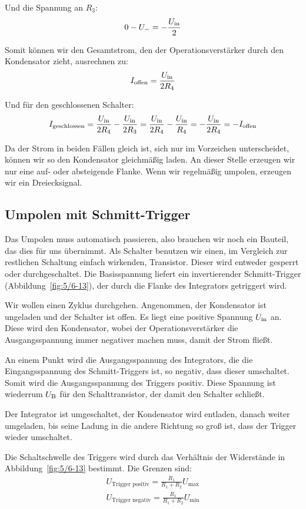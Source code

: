 Und die Spannung an $R_3$:
\[
	0 - U_- = - \frac{U_\text{in}}2
\]

Somit können wir den Gesamtstrom, den der Operationsverstärker durch den
Kondensator zieht, ausrechnen zu:
\[
	I_\text{offen}
	= \frac{U_\text{in}}{2 R_4}
\]

Und für den geschlossenen Schalter:
\[
	I_\text{geschlossen}
	= \frac{U_\text{in}}{2 R_4} - \frac{U_\text{in}}{2 R_3}
	= \frac{U_\text{in}}{2 R_4} - \frac{U_\text{in}}{R_4}
	= - \frac{U_\text{in}}{2 R_4}
	= - I_\text{offen}
\]

Da der Strom in beiden Fällen gleich ist, sich nur im Vorzeichen unterscheidet,
können wir so den Kondensator gleichmäßig laden. An dieser Stelle erzeugen wir
nur eine auf- oder absteigende Flanke. Wenn wir regelmäßig umpolen, erzeugen
wir ein Dreiecksignal.

\subsection{Umpolen mit Schmitt-Trigger}

Das Umpolen muss automatisch passieren, also brauchen wir noch ein Bauteil, das
dies für uns übernimmt. Als Schalter benutzen wir einen, im Vergleich zur
restlichen Schaltung einfach wirkenden, Transistor. Dieser wird entweder
gesperrt oder durchgeschaltet. Die Basisspannung liefert ein invertierender
Schmitt-Trigger (Abbildung~\ref{fig:5/6-13}), der durch die Flanke des
Integrators getriggert wird.

Wir wollen einen Zyklus durchgehen. Angenommen, der Kondensator ist ungeladen
und der Schalter ist offen.
Es liegt eine positive Spannung $U_\text{in}$ an. Diese wird den Kondensator, wobei
der Operationsverstärker die Ausgangsspannung immer negativer machen muss,
damit der Strom fließt.

An einem Punkt wird die Ausgangsspannung des
Integrators, die die Eingangsspannung des Schmitt-Triggers ist, so negativ,
dass dieser umschaltet. Somit wird die Ausgangsspannung des Triggers positiv.
Diese Spannung ist wiederrum $U_\text{B}$ für den Schalttransistor, der damit den
Schalter schließt.

Der Integrator ist umgeschaltet, der Kondensator wird entladen, danach weiter
umgeladen, bis seine Ladung in die andere Richtung so groß ist, dass der
Trigger wieder umschaltet.

Die Schaltschwelle des Triggers wird durch das Verhältnis der Widerstände in
Abbildung~\ref{fig:5/6-13} bestimmt. Die Grenzen sind:
\cite[(5/6.18)]{physik313-Anleitung}
\begin{gather*}
	U_\text{Trigger positiv} = \frac{R_1}{R_1 + R_2} U_\text{max} \\
	U_\text{Trigger negativ} = \frac{R_1}{R_1 + R_2} U_\text{min}
\end{gather*}

